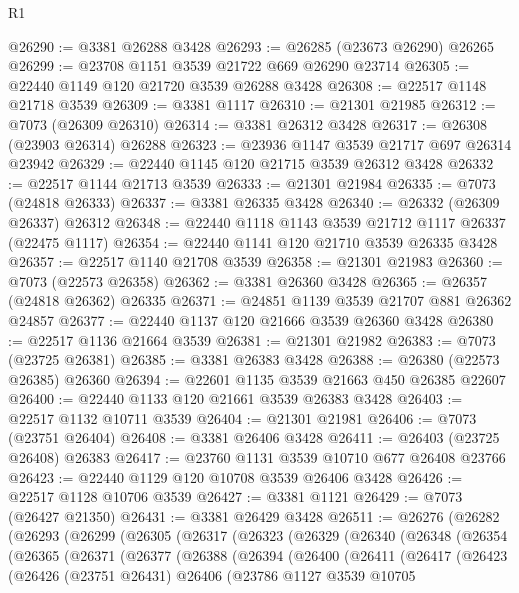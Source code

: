\begin{lexlean}{R1}
\begin{coremodule}
@26290 := @3381 @26288 @3428
@26293 := @26285 (@23673 @26290) @26265
@26299 := @23708 @1151 @3539 @21722 @669 @26290 @23714
@26305 := @22440 @1149 @120 @21720 @3539 @26288 @3428
@26308 := @22517 @1148 @21718 @3539
@26309 := @3381 @1117
@26310 := @21301 @21985
@26312 := @7073 (@26309 @26310)
@26314 := @3381 @26312 @3428
@26317 := @26308 (@23903 @26314) @26288
@26323 := @23936 @1147 @3539 @21717 @697 @26314 @23942
@26329 := @22440 @1145 @120 @21715 @3539 @26312 @3428
@26332 := @22517 @1144 @21713 @3539
@26333 := @21301 @21984
@26335 := @7073 (@24818 @26333)
@26337 := @3381 @26335 @3428
@26340 := @26332 (@26309 @26337) @26312
@26348 := @22440 @1118 @1143 @3539 @21712 @1117 @26337 (@22475 @1117)
@26354 := @22440 @1141 @120 @21710 @3539 @26335 @3428
@26357 := @22517 @1140 @21708 @3539
@26358 := @21301 @21983
@26360 := @7073 (@22573 @26358)
@26362 := @3381 @26360 @3428
@26365 := @26357 (@24818 @26362) @26335
@26371 := @24851 @1139 @3539 @21707 @881 @26362 @24857
@26377 := @22440 @1137 @120 @21666 @3539 @26360 @3428
@26380 := @22517 @1136 @21664 @3539
@26381 := @21301 @21982
@26383 := @7073 (@23725 @26381)
@26385 := @3381 @26383 @3428
@26388 := @26380 (@22573 @26385) @26360
@26394 := @22601 @1135 @3539 @21663 @450 @26385 @22607
@26400 := @22440 @1133 @120 @21661 @3539 @26383 @3428
@26403 := @22517 @1132 @10711 @3539
@26404 := @21301 @21981
@26406 := @7073 (@23751 @26404)
@26408 := @3381 @26406 @3428
@26411 := @26403 (@23725 @26408) @26383
@26417 := @23760 @1131 @3539 @10710 @677 @26408 @23766
@26423 := @22440 @1129 @120 @10708 @3539 @26406 @3428
@26426 := @22517 @1128 @10706 @3539
@26427 := @3381 @1121
@26429 := @7073 (@26427 @21350)
@26431 := @3381 @26429 @3428
@26511 := @26276
    (@26282
      (@26293
        (@26299
          (@26305
            (@26317
              (@26323
                (@26329
                  (@26340
                    (@26348
                      (@26354
                        (@26365
                          (@26371
                            (@26377
                              (@26388
                                (@26394
                                  (@26400
                                    (@26411
                                      (@26417
                                        (@26423
                                          (@26426
                                            (@23751 @26431)
                                            @26406
                                            (@23786
                                              @1127
                                              @3539
                                              @10705

\end{coremodule}
\end{lexlean}
